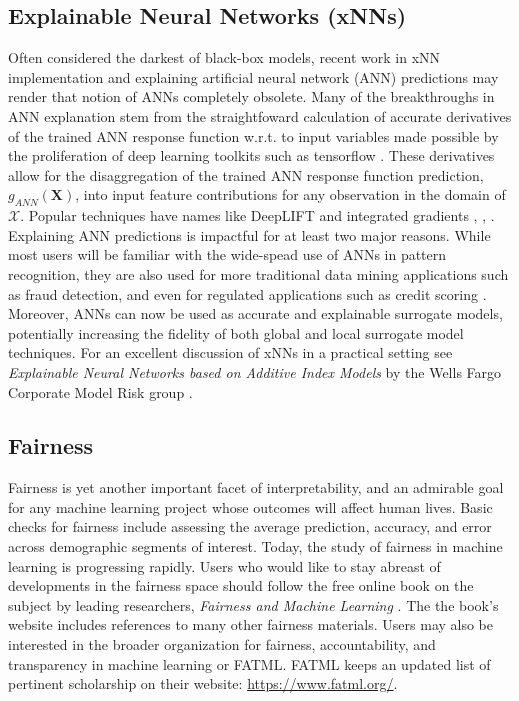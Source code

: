 \documentclass[11pt]{asaproc}
\begin{document}
\subsection{Explainable Neural Networks (xNNs)}

Often considered the darkest of black-box models, recent work in xNN implementation and explaining artificial neural network (ANN) predictions may render that notion of ANNs completely obsolete. Many of the breakthroughs in ANN explanation stem from the straightfoward calculation of accurate derivatives of the trained ANN response function w.r.t. to input variables made possible by the proliferation of deep learning toolkits such as tensorflow \cite{raissi2017physics}. These derivatives allow for the disaggregation of the trained ANN response function prediction, $g_{ANN}(\mathbf{X})$, into input feature contributions for any observation in the domain of $\mathcal{X}$. Popular techniques have names like DeepLIFT and integrated gradients \cite{deeplift}, \cite{integrated_grads}, \cite{grad_attr}. Explaining ANN predictions is impactful for at least two major reasons. While most users will be familiar with the wide-spead use of ANNs in pattern recognition, they are also used for more traditional data mining applications such as fraud detection, and even for regulated applications such as credit scoring \cite{mli_booklet}. Moreover, ANNs can now be used as accurate and explainable surrogate models, potentially increasing the fidelity of both global and local surrogate model techniques. For an excellent discussion of xNNs in a practical setting see \textit{Explainable Neural Networks based on Additive Index Models} by the Wells Fargo Corporate Model Risk group \cite{wf_xnn}.

\subsection{Fairness}

Fairness is yet another important facet of interpretability, and an admirable goal for any machine learning project whose outcomes will affect human lives. Basic checks for fairness include assessing the average prediction, accuracy, and error across demographic segments of interest. Today, the study of fairness in machine learning is progressing rapidly. Users who would like to stay abreast of developments in the fairness space should follow the free online book on the subject by leading researchers, \textit{Fairness and Machine Learning} \cite{fairness_book}. The the book's website includes references to many other fairness materials. Users may also be interested in the broader organization for fairness, accountability, and transparency in machine learning or FATML. FATML keeps an updated list of pertinent scholarship on their website: \url{https://www.fatml.org/}. 
\end{document}
